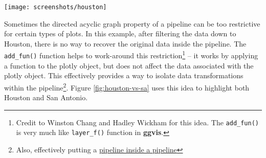 \documentclass[12pt,]{isuthesis}
\newenvironment{Shaded}{\begin{snugshade}}{\end{snugshade}}
\newcommand{\KeywordTok}[1]{\textcolor[rgb]{0.13,0.29,0.53}{\textbf{{#1}}}}
\newcommand{\DataTypeTok}[1]{\textcolor[rgb]{0.13,0.29,0.53}{{#1}}}
\newcommand{\FloatTok}[1]{\textcolor[rgb]{0.00,0.00,0.81}{{#1}}}
\newcommand{\StringTok}[1]{\textcolor[rgb]{0.31,0.60,0.02}{{#1}}}
\newcommand{\NormalTok}[1]{{#1}}
\let\rmarkdownfootnote\footnote%
\def\footnote{\protect\rmarkdownfootnote}
\begin{document}
\begin{Shaded}
\end{Shaded}

\texttt{[image: screenshots/houston]}

Sometimes the directed acyclic graph property of a pipeline can be too
restrictive for certain types of plots. In this example, after filtering
the data down to Houston, there is no way to recover the original data
inside the pipeline. The \texttt{add\_fun()} function helps to
work-around this restriction\footnote{Credit to Winston Chang and Hadley
  Wickham for this idea. The \texttt{add\_fun()} is very much like
  \texttt{layer\_f()} function in \textbf{ggvis}.} -- it works by
applying a function to the plotly object, but does not affect the data
associated with the plotly object. This effectively provides a way to
isolate data transformations within the pipeline\footnote{Also,
  effectively putting a
  \href{http://www.memecreator.org/meme/yo-dawg-i-heard-u-like-pipelines-so-we-put-a-pipeline-in-your-pipeline}{pipeline
  inside a pipeline}}. Figure \ref{fig:houston-vs-sa} uses this idea to
highlight both Houston and San Antonio.

\begin{Shaded}
\end{Shaded}
\end{document}
